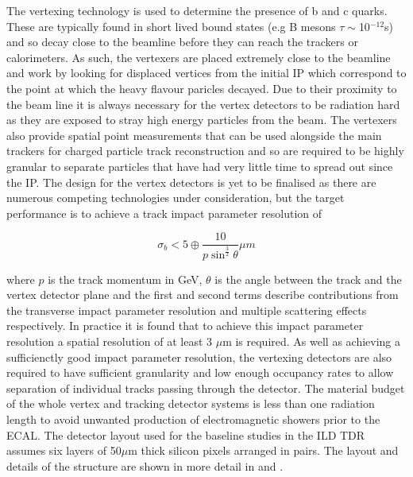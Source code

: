 The vertexing technology is used to determine the presence of b and c quarks. These are typically found in short lived bound states (e.g B mesons $\tau\sim$10$^{-12}$s) and so decay close to the beamline before they can reach the trackers or calorimeters. As such, the vertexers are placed extremely close to the beamline and work by looking for displaced vertices from the initial \ac{IP} which correspond to the point at which the heavy flavour paricles decayed. Due to their proximity to the beam line it is always necessary for the vertex detectors to be radiation hard as they are exposed to stray high energy particles from the beam. The vertexers also provide spatial point measurements that can be used alongside the main trackers for charged particle track reconstruction and so are required to be highly granular to separate particles that have had very little time to spread out since the \ac{IP}. The design for the vertex detectors is yet to be finalised as there are numerous competing technologies under consideration, but the target performance\cite{ILCTDR} is to achieve a track impact parameter resolution of

\begin{equation}
\sigma_{b} < 5 \oplus \frac{10}{p\sin^{\frac{3}{2}}\theta}\mu m
\end{equation}

where $p$ is the track momentum in GeV, $\theta$ is the angle between the track and the vertex detector plane and the first and second terms describe contributions from the transverse impact parameter resolution and multiple scattering effects respectively.  In practice it is found that to achieve this impact parameter resolution a spatial resolution of at least 3 $\mu$m is required. As well as achieving a sufficienctly good impact parameter resolution, the vertexing detectors are also required to have sufficient granularity and low enough occupancy rates to allow separation of individual tracks passing through the detector. The material budget of the whole vertex and tracking detector systems is less than one radiation length to avoid unwanted production of electromagnetic showers prior to the \ac{ECAL}. The detector layout used for the baseline studies in the \ac{ILD} \ac{TDR} assumes six layers of 50$\mu$m thick silicon pixels arranged in pairs. The layout and details of the structure are shown in more detail in  and .

